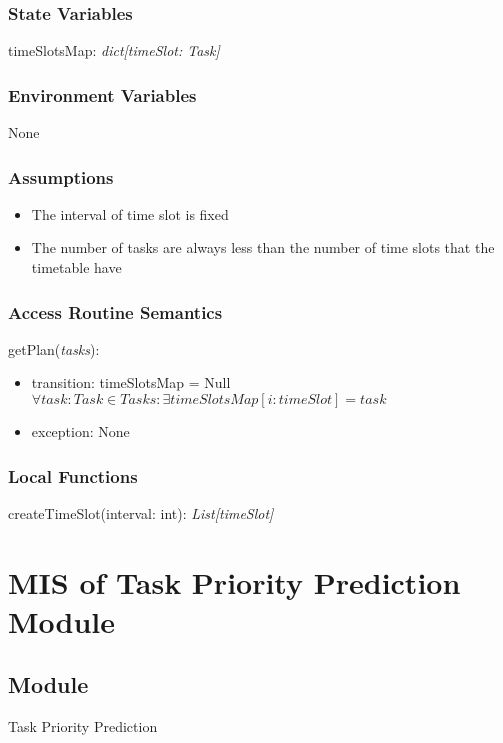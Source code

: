 \documentclass[12pt, titlepage]{article}
\begin{document}
\subsubsection{State Variables}

timeSlotsMap: \textit{dict[timeSlot: Task]}

\subsubsection{Environment Variables}
None

\subsubsection{Assumptions}

\begin{itemize}
  \item The interval of time slot is fixed 
  \item The number of tasks are always less than the number of time slots that the timetable have
\end{itemize}

\subsubsection{Access Routine Semantics}

\noindent getPlan(\textit{tasks}):
\begin{itemize}
\item transition: timeSlotsMap = Null \implies \( \forall task: Task \in Tasks: \exists timeSlotsMap[i: timeSlot] = task \)
\item exception: None
\end{itemize}


\subsubsection{Local Functions}
createTimeSlot(interval: int): \textit{List[timeSlot]}

\newpage
\section{MIS of Task Priority Prediction Module} \label{TaskPriorityPredictionModule}

\subsection{Module}
Task Priority Prediction
\end{document}
